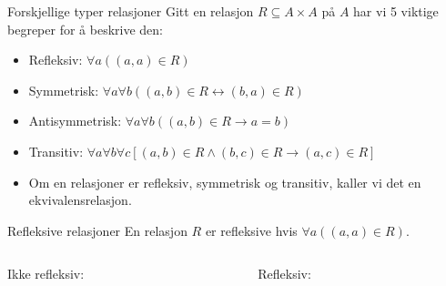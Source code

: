 \begin{frame}{Forskjellige typer relasjoner}
Gitt en relasjon $R \subseteq A \times A$ på $A$ har vi 5 viktige begreper for å beskrive den:
    \begin{itemize}
        \item Refleksiv: $\forall a ((a, a) \in R)$
        \item Symmetrisk: $\forall a \forall b ((a, b) \in R \leftrightarrow (b, a) \in R)$
        \item Antisymmetrisk: $\forall a \forall b ((a, b) \in R \rightarrow a = b)$
        \item Transitiv: $\forall a \forall b \forall c [(a, b) \in R \land (b, c) \in R \rightarrow (a, c) \in R]$\\

        \item Om en relasjoner er refleksiv, symmetrisk og transitiv, kaller vi det en ekvivalensrelasjon.
    \end{itemize}   
\end{frame}

\begin{frame}[fragile]{Refleksive relasjoner}
En relasjon $R$ er refleksive hvis $\forall a ((a, a) \in R)$.\\
    \begin{columns}
        \begin{column}{0.3\textwidth}
        Ikke refleksiv:
        \end{column}
        \begin{column}{0.3\textwidth}
Refleksiv:
        \end{column}
    \end{columns}
\end{frame}

